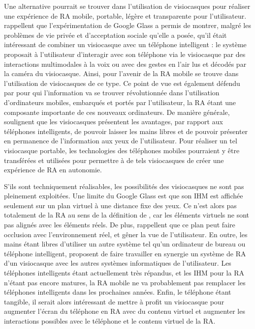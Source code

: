 Une alternative pourrait se trouver dans l'utilisation de visiocasques pour réaliser une expérience de RA mobile, portable, légère et transparente pour l'utilisateur. \citet{KoelleKranzMoeller2015} rappellent que l'expérimentation de Google Glass a permis de montrer, malgré les problèmes de vie privée et d'acceptation sociale qu'elle a posée, qu'il était intéressant de combiner un visiocasque avec un téléphone intelligent : le système proposait à l'utilisateur d'interagir avec son téléphone via le visiocasque par des interactions multimodales à la voix ou avec des gestes en l'air lus et décodés par la caméra du visiocasque. Ainsi, pour \citet{HuangHuiPeyloEtAl2013} l'avenir de la RA mobile se trouve dans l'utilisation de visiocasques de ce type. Ce point de vue est également défendu par \citet{SwanGabbard2005} pour qui l'information va se trouver révolutionnée dans l'utilisation d'ordinateurs mobiles, embarqués et portés par l'utilisateur, la RA étant une composante importante de ces nouveaux ordinateurs. De manière générale, \citet{SerranoEnsYangEtAl2015} soulignent que les visiocasques présentent les avantages, par rapport aux téléphones intelligents, de pouvoir laisser les mains libres et de pouvoir présenter en permanence de l'information aux yeux de l'utilisateur. Pour réaliser un tel visiocasque portable, les technologies des téléphones mobiles pourraient y être transférées et utilisées pour permettre à de tels visiocasques de créer une expérience de RA en autonomie.

S'ils sont techniquement réalisables, les possibilités des visiocasques ne sont pas pleinement exploitées. Une limite du Google Glass est que son IHM est affichée seulement sur un plan virtuel à une distance fixe des yeux. Ce n'est alors pas totalement de la RA au sens de la définition de \citet{AzumaBaillotBehringerEtAl2001}, car les éléments virtuels ne sont pas alignés avec les éléments réels. De plus, \citet{SerranoEnsYangEtAl2015} rappellent que ce plan peut faire occlusion avec l'environnement réel, et gêner la vue de l'utilisateur. En outre, les mains étant libres d'utiliser un autre système tel qu'un ordinateur de bureau ou téléphone intelligent, \citet{SerranoEnsYangEtAl2015b} proposent de faire travailler en synergie un système de RA d'un visiocasque avec les autres systèmes informatiques de l'utilisateur. Les téléphones intelligents étant actuellement très répandus, et les IHM pour la RA n'étant pas encore matures, la RA mobile ne va probablement pas remplacer les téléphones intelligents dans les prochaines années. Enfin, le téléphone étant tangible, il serait alors intéressant de mettre à profit un visiocasque pour augmenter l'écran du téléphone en RA avec du contenu virtuel et augmenter les interactions possibles avec le téléphone et le contenu virtuel de la RA. 

